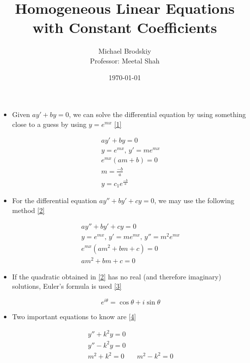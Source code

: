 \documentclass[12pt]{article}
\title{Homogeneous Linear Equations with Constant Coefficients}
\date{\today}
\author{Michael Brodskiy\\ \small Professor: Meetal Shah}
\begin{document}
\maketitle

\begin{itemize}

  \item Given $ay'+by=0$, we can solve the differential equation by using something close to a guess by using $y=e^{mx}$ \eqref{1}

    \begin{equation}
      \begin{split}
        ay'+by=0\\
        y=e^{mx},\,y'=me^{mx}\\
        e^{mx}(am+b)=0\\
        m=\frac{-b}{a}\\
        y=c_1e^{\frac{-b}{a}}
      \end{split}
      \label{1}
    \end{equation}

  \item For the differential equation $ay''+by'+cy=0$, we may use the following method \eqref{2}

    \begin{equation}
      \begin{split}
        ay''+by'+cy=0\\
        y=e^{mx},\,y'=me^{mx},\,y''=m^2e^{mx}\\
        e^{mx}(am^2+bm+c)=0\\
        am^2+bm+c=0
      \end{split}
      \label{2}
    \end{equation}

  \item If the quadratic obtained in \eqref{2} has no real (and therefore imaginary) solutions, Euler's formula is used \eqref{3}

    \begin{equation}
      e^{i\theta}=\cos \theta + i\sin \theta
      \label{3}
    \end{equation}

  \item Two important equations to know are \eqref{4}

    \begin{equation}
      \begin{split}
        y''+k^2y=0\\
        y''-k^2y=0\\
        m^2+k^2=0 &\,\,\,\,\, m^2-k^2=0\\
      \end{split}
      \label{4}
    \end{equation}


\end{itemize}
\end{document}
